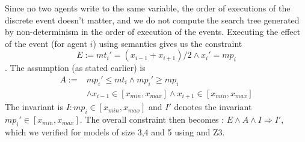 Since no two agents write to the same variable, the order of executions of the discrete event doesn't matter, and we do not compute the search tree generated by non-determinism in the order of execution of the events. Executing the effect of the event (for agent $i$) using \K semantics gives us the constraint $$E := mt_i' = (x_{i-1} + x_{i+1})/2  \wedge x_i' = mp_i$$.  The assumption (as stated earlier) is \begin{align*}A := &mp_i' \leq mt_i \wedge mp_i' \geq mp_i \\ &\wedge  x_{i-1} \in [x_{min}, x_{max}] \wedge x_{i+1}\in [x_{min},x_{max}]\end{align*} The invariant is $I: \mathit{mp}_i \in [x_{min}, x_{max}]$ and $I'$ denotes the invariant $\mathit{mp}_i' \in [x_{min}, x_{max}].$  The overall constraint then becomes :
                   $E \wedge A \wedge I \Rightarrow I',$ which we verified for models of size 3,4 and 5 using \K and Z3.






